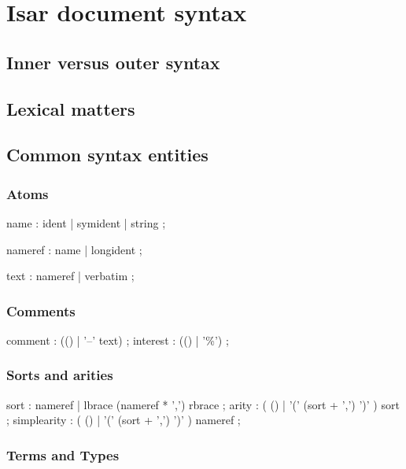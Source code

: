 
\chapter{Isar document syntax}

\section{Inner versus outer syntax}

\section{Lexical matters}

\section{Common syntax entities}

\subsection{Atoms}

\begin{rail}
  name : ident | symident | string
  ;

  nameref : name | longident
  ;

  text : nameref | verbatim
  ;
\end{rail}

\subsection{Comments}

\begin{rail}
  comment : (() | '--' text)
  ;
  interest : (() | '\%')
  ;
\end{rail}


\subsection{Sorts and arities}

\begin{rail}
  sort : nameref | lbrace (nameref * ',') rbrace
  ;
  arity : ( () | '(' (sort + ',') ')' ) sort
  ;
  simple\-arity : ( () | '(' (sort + ',') ')' ) nameref
  ;
\end{rail}


\subsection{Terms and Types}

